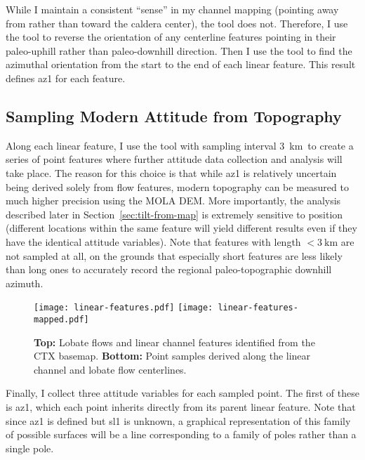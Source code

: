While I maintain a consistent ``sense'' in my channel mapping (pointing away from rather than toward the caldera center), the  tool does not. Therefore, I use the  tool to reverse the orientation of any centerline features pointing in their paleo-uphill rather than paleo-downhill direction. Then I use the  tool to find the azimuthal orientation from the start to the end of each linear feature. This result defines \acf{az1} for each feature.

\subsection{Sampling Modern Attitude from Topography}

\newcommand{\samplinginterval}{\qty{3}{\km}}

Along each linear feature, I use the  tool with sampling interval \samplinginterval\ to create a series of point features where further attitude data collection and analysis will take place. The reason for this choice is that while \acf{az1} is relatively uncertain being derived solely from flow features, modern topography can be measured to much higher precision using the \ac{MOLA} \ac{DEM}. More importantly, the analysis described later in Section~\ref{sec:tilt-from-map} is extremely sensitive to position (different locations within the same feature will yield different results even if they have the identical attitude variables). Note that features with length $<\samplinginterval$ are not sampled at all, on the grounds that especially short features are less likely than long ones to accurately record the regional paleo-topographic downhill azimuth.

\begin{figure}
    \texttt{[image: linear-features.pdf]}
    \texttt{[image: linear-features-mapped.pdf]}
    \caption[Mapping linear features]{\textbf{Top:} Lobate flows and linear channel features identified from the \acs{CTX} basemap. \textbf{Bottom:} Point samples derived along the linear channel and lobate flow centerlines.}%
    \label{fig:linear-features}
\end{figure}

\newcommand{\neighborhood}{\qty{2}{\km}}

Finally, I collect three attitude variables for each sampled point. The first  of these is \ac{az1}, which each point inherits directly from its parent linear feature. Note that since \ac{az1} is defined but \acf{sl1} is unknown, a graphical representation of this family of possible surfaces will be a line corresponding to a family of poles rather than a single pole.

